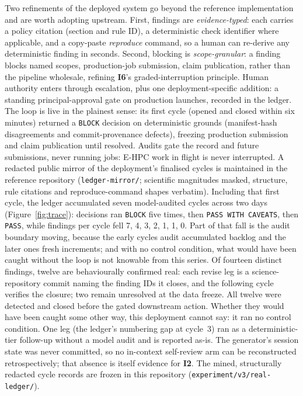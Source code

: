\documentclass[11pt]{article}
\newcommand{\invariant}[1]{\textbf{I#1}}
\begin{document}
Two refinements of the deployed system go beyond the reference implementation and are worth adopting upstream. First, findings are \emph{evidence-typed}: each carries a policy citation (section and rule ID), a deterministic check identifier where applicable, and a copy-paste \emph{reproduce} command, so a human can re-derive any deterministic finding in seconds. Second, blocking is \emph{scope-granular}: a finding blocks named scopes, production-job submission, claim publication, rather than the pipeline wholesale, refining \invariant{6}'s graded-interruption principle. Human authority enters through escalation, plus one deployment-specific addition: a standing principal-approval gate on production launches, recorded in the ledger. The loop is live in the plainest sense: its first cycle (opened and closed within six minutes) returned a \texttt{BLOCK} decision on deterministic grounds (manifest-hash disagreements and commit-provenance defects), freezing production submission and claim publication until resolved. Audits gate the record and future submissions, never running jobs: E-HPC work in flight is never interrupted. A redacted public mirror of the deployment's finalised cycles is maintained in the reference repository (\texttt{ledger-mirror/}; scientific magnitudes masked, structure, rule citations and reproduce-command shapes verbatim). Including that first cycle, the ledger accumulated seven model-audited cycles across two days (Figure~\ref{fig:trace}): decisions ran \texttt{BLOCK} five times, then \texttt{PASS WITH CAVEATS}, then \texttt{PASS}, while findings per cycle fell 7, 4, 3, 2, 1, 1, 0. Part of that fall is the audit boundary moving, because the early cycles audit accumulated backlog and the later ones fresh increments; and with no control condition, what would have been caught without the loop is not knowable from this series. Of fourteen distinct findings, twelve are behaviourally confirmed real: each revise leg is a science-repository commit naming the finding IDs it closes, and the following cycle verifies the closure; two remain unresolved at the data freeze. All twelve were detected and closed before the gated downstream action. Whether they would have been caught some other way, this deployment cannot say: it ran no control condition. One leg (the ledger's numbering gap at cycle~3) ran as a deterministic-tier follow-up without a model audit and is reported as-is. The generator's session state was never committed, so no in-context self-review arm can be reconstructed retrospectively; that absence is itself evidence for \invariant{2}. The mined, structurally redacted cycle records are frozen in this repository (\texttt{experiment/v3/real-ledger/}).
\end{document}
